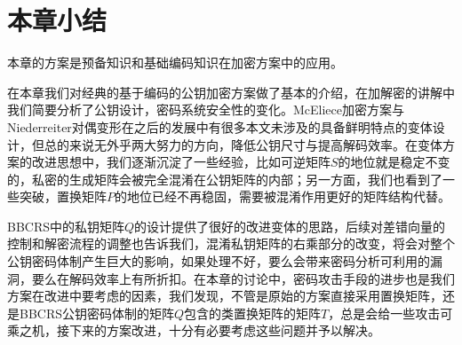 \section{本章小结}
本章的方案是预备知识和基础编码知识在加密方案中的应用。

在本章我们对经典的基于编码的公钥加密方案做了基本的介绍，在加解密的讲解中我们简要分析了公钥设计，密码系统安全性的变化。McEliece加密方案与Niederreiter对偶变形在之后的发展中有很多本文未涉及的具备鲜明特点的变体设计，但总的来说无外乎两大努力的方向，降低公钥尺寸与提高解码效率。在变体方案的改进思想中，我们逐渐沉淀了一些经验，比如可逆矩阵$S$的地位就是稳定不变的，私密的生成矩阵会被完全混淆在公钥矩阵的内部；另一方面，我们也看到了一些突破，置换矩阵$P$的地位已经不再稳固，需要被混淆作用更好的矩阵结构代替。

BBCRS中的私钥矩阵$Q$的设计提供了很好的改进变体的思路，后续对差错向量的控制和解密流程的调整也告诉我们，混淆私钥矩阵的右乘部分的改变，将会对整个公钥密码体制产生巨大的影响，如果处理不好，要么会带来密码分析可利用的漏洞，要么在解码效率上有所折扣。在本章的讨论中，密码攻击手段的进步也是我们方案在改进中要考虑的因素，我们发现，不管是原始的方案直接采用置换矩阵，还是BBCRS公钥密码体制的矩阵$Q$包含的类置换矩阵的矩阵$T$，总是会给一些攻击可乘之机，接下来的方案改进，十分有必要考虑这些问题并予以解决。